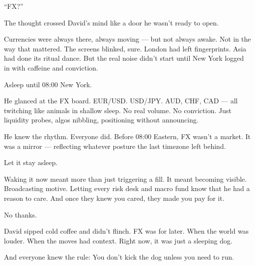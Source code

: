 \medskip

“FX?”

The thought crossed David’s mind like a door he wasn’t ready to open.

Currencies were always there, always moving — but not always awake. Not in the way that mattered. The screens blinked, sure. London had left fingerprints. Asia had done its ritual dance. But the real noise didn’t start until New York logged in with caffeine and conviction.

Asleep until 08:00 New York.

He glanced at the FX board. EUR/USD. USD/JPY. AUD, CHF, CAD — all twitching like animals in shallow sleep. No real volume. No conviction. Just liquidity probes, algos nibbling, positioning without announcing.

He knew the rhythm. Everyone did. Before 08:00 Eastern, FX wasn’t a market. It was a mirror — reflecting whatever posture the last timezone left behind.

Let it stay asleep.

Waking it now meant more than just triggering a fill. It meant becoming visible. Broadcasting motive. Letting every risk desk and macro fund know that he had a reason to care. And once they knew you cared, they made you pay for it.

No thanks.

David sipped cold coffee and didn’t flinch. FX was for later. When the world was louder. When the moves had context. Right now, it was just a sleeping dog.

And everyone knew the rule:
You don’t kick the dog unless you need to run.


